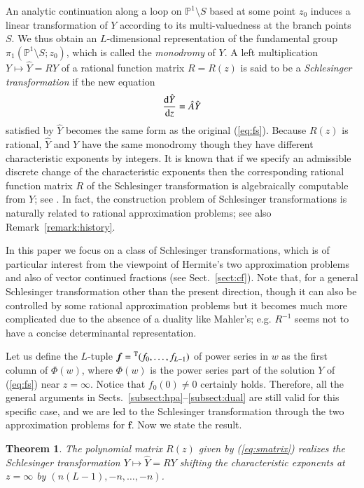 \documentclass[12pt]{article}
\newtheorem{thm}{Theorem}[section]
\numberwithin{equation}{section}
\begin{document}
An analytic continuation along a loop on ${\mathbb P}^1 \setminus S$
based at some point $z_0$
induces a linear transformation of  $Y$
according to its multi-valuedness at the branch points $S$.
We thus obtain an
$L$-dimensional representation of the fundamental group
$\pi_1({\mathbb P}^1 \setminus S;z_0)$,
which is called the {\it monodromy} of $Y$. 
A left multiplication
$Y \mapsto \hat{Y}=RY$
of a rational  function matrix $R=R(z)$
is said to be a {\it Schlesinger transformation} if
the new equation
\[
\frac{{\rm d} \hat{Y}}{{\rm d} z}
=\hat{A} \hat{Y}
\]
satisfied by $\hat Y$ becomes the same form as the original (\ref{eq:fs}).
Because $R(z)$ is rational, 
$\hat Y$ and $Y$ have the same monodromy though they have different characteristic exponents by integers.
It is known that if we specify an admissible discrete change of the 
 characteristic exponents then
 the corresponding rational function matrix $R$
 of the Schlesinger transformation 
  is algebraically  computable from $Y$;
see \cite{jm81, sch12}.
In fact, the construction problem of Schlesinger transformations
is naturally related to rational approximation problems; see also Remark~\ref{remark:history}.



In this paper
we focus on
a class of Schlesinger transformations,
which is of particular interest from the viewpoint of 
Hermite's two approximation problems
and also of vector continued fractions (see Sect.~\ref{sect:cf}).
Note that, for a general Schlesinger transformation
other than the present direction,
though it can also be controlled by some rational approximation problems
but
it becomes much more complicated due to the absence 
of a duality like Mahler's; 
e.g.  $R^{-1}$ seems not to have a concise 
determinantal representation.





Let us define the $L$-tuple
${\boldsymbol f}={}^{\rm T}(f_0, \ldots,f_{L-1})$ of power series 
in $w$ 
as the first column of $\Phi(w)$,
where $\Phi(w)$ is the power series part of the solution $Y$ 
of (\ref{eq:fs}) near $z=\infty$.
Notice that $f_0(0)\neq 0$  certainly holds.
Therefore, all the general arguments in Sects.~\ref{subsect:hpa}--\ref{subsect:dual} are still valid for this specific case, and we are led to 
the Schlesinger transformation through the two approximation problems
for ${\boldsymbol f}$.
Now we state the result.



\begin{thm} 
 \label{thm:schl}
The polynomial matrix $R(z)$ given by  {\rm(\ref{eq:smatrix})}
realizes the Schlesinger transformation
$Y \mapsto \hat{Y}=R Y$ 
shifting 
the characteristic exponents at 
$z=\infty$
by
 $(n(L-1),-n,\ldots,-n)$.
\end{thm}
\end{document}
